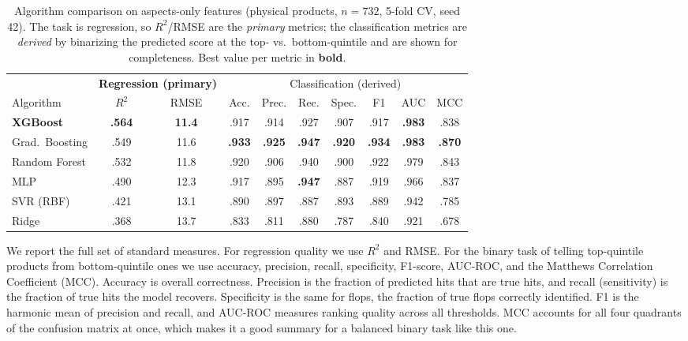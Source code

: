 \documentclass[journal]{IEEEtran}
\begin{document}
\begin{table}[!t]
\centering
\caption{Algorithm comparison on aspects-only features (physical products, $n=732$, 5-fold CV, seed 42). The task is regression, so $R^2$/RMSE are the \emph{primary} metrics; the classification metrics are \emph{derived} by binarizing the predicted score at the top- vs.\ bottom-quintile and are shown for completeness. Best value per metric in \textbf{bold}.}
\label{tab:algo}
\footnotesize
\setlength{\tabcolsep}{3.5pt}
\begin{tabular}{@{}lcc|ccccccc@{}}
\toprule
 & \multicolumn{2}{c|}{\textbf{Regression (primary)}} & \multicolumn{7}{c}{Classification (derived)} \\
\cmidrule(lr){2-3}\cmidrule(lr){4-10}
Algorithm & $R^2$ & RMSE & Acc. & Prec. & Rec. & Spec. & F1 & AUC & MCC \\
\midrule
\textbf{XGBoost}  & \textbf{.564} & \textbf{11.4} & .917 & .914 & .927 & .907 & .917 & \textbf{.983} & .838 \\
Grad.\ Boosting   & .549 & 11.6 & \textbf{.933} & \textbf{.925} & \textbf{.947} & \textbf{.920} & \textbf{.934} & \textbf{.983} & \textbf{.870} \\
Random Forest     & .532 & 11.8 & .920 & .906 & .940 & .900 & .922 & .979 & .843 \\
MLP               & .490 & 12.3 & .917 & .895 & \textbf{.947} & .887 & .919 & .966 & .837 \\
SVR (RBF)         & .421 & 13.1 & .890 & .897 & .887 & .893 & .889 & .942 & .785 \\
Ridge             & .368 & 13.7 & .833 & .811 & .880 & .787 & .840 & .921 & .678 \\
\bottomrule
\end{tabular}
\end{table}

We report the full set of standard measures. For regression quality we use $R^2$ and RMSE. For the binary task of telling top-quintile products from bottom-quintile ones we use accuracy, precision, recall, specificity, F1-score, AUC-ROC, and the Matthews Correlation Coefficient (MCC). Accuracy is overall correctness. Precision is the fraction of predicted hits that are true hits, and recall (sensitivity) is the fraction of true hits the model recovers. Specificity is the same for flops, the fraction of true flops correctly identified. F1 is the harmonic mean of precision and recall, and AUC-ROC measures ranking quality across all thresholds. MCC accounts for all four quadrants of the confusion matrix at once, which makes it a good summary for a balanced binary task like this one.
\end{document}
